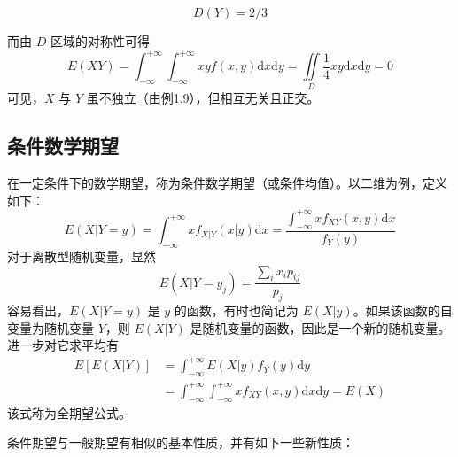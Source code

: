 \documentclass[11pt,openany,UTF8]{ctexbook}
\newcommand{\dif}{\mathrm{d}}                      %
\begin{document}
\begin{examplebox}
\end{examplebox}

\[
D(Y)=2/3
\]

而由 $D$ 区域的对称性可得
\[
E(XY)=\int_{-\infty}^{+\infty}\!\!\int_{-\infty}^{+\infty}xyf(x,y)\dif x\dif y
=\iint\limits_D \frac{1}{4}xy\dif x\dif y=0
\]
可见\nobreak，$X$ 与 $Y$ 虽不独立（由例1.9\nobreak）\nobreak，但相互无关且正交\nobreak。

\subsection{条件数学期望}

在一定条件下的数学期望\nobreak，称为条件数学期望（或条件均值\nobreak）\nobreak。以二维为例\nobreak，定义如下\nobreak：
\begin{equation}
E(X|Y=y)=\int_{-\infty}^{+\infty}xf_{X|Y}(x|y)\dif x
=\frac{\int_{-\infty}^{+\infty}xf_{XY}(x,y)\dif x}{f_Y(y)}
\label{eq:1.51}
\end{equation}
对于离散型随机变量\nobreak，显然
\begin{equation}
E(X|Y=y_j)=\frac{\sum\limits_i x_ip_{ij}}{p_j}
\label{eq:1.52}
\end{equation}
容易看出\nobreak，$E(X|Y=y)$ 是 $y$ 的函数\nobreak，有时也简记为 $E(X|y)$\nobreak。如果该函数的自变量为随机变量 $Y$\nobreak，则 $E(X|Y)$ 是随机变量的函数\nobreak，因此是一个新的随机变量\nobreak。进一步对它求平均有
\begin{equation}
\begin{split}
E[E(X|Y)]&=\int_{-\infty}^{+\infty}E(X|y)f_Y(y)\dif y\\
&=\int_{-\infty}^{+\infty}\!\!\int_{-\infty}^{+\infty}xf_{XY}(x,y)\dif x\dif y=E(X)
\end{split}
\label{eq:1.53}
\end{equation}
该式称为全期望公式\nobreak。

条件期望与一般期望有相似的基本性质\nobreak，并有如下一些新性质\nobreak：
\end{document}
